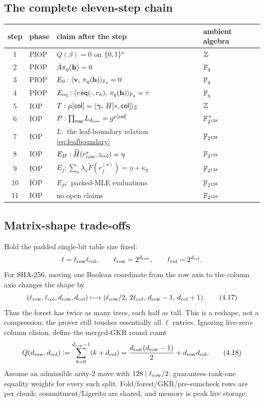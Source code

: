 \subsection{The complete eleven-step chain}

\begin{center}\small
\begin{tabular}{@{}clp{}l@{}}
\toprule
step & phase & claim after the step & ambient algebra\\
\midrule
1 & PIOP & $Q(\beta)=0$ on $\{0,1\}^{\nu}$ & $\mathbb{Z}$\\
2 & PIOP & $\bar A\pi_q(\mathbf{h})=0$ & $\mathbb{F}_q$\\
3 & PIOP & $E_0:\langle \mathbf{v},\, \pi_q(\mathbf{h})\rangle_{\mathbb{F}_q}=0$ & $\mathbb{F}_q$\\
4 & PIOP & $E_{\rm eq}:\langle c\,\mathsf{eq}(\cdot,r_h),\, \pi_q(\mathbf{h})\rangle_{\mathbb{F}_q}=\tau$ & $\mathbb{F}_q$\\
5 & IOP & $T:\mu[\mathsf{col}]=\langle \bm{\gamma},\, H[*,\mathsf{col}]\rangle_{\mathbb{Z}}$ & $\mathbb{Z}$\\
6 & IOP & $P:\prod_{\mathsf{row}}L_{d_{\mathrm{row}}}=g^{\mu[\mathsf{col}]}$ & $\mathbb{F}_{2^{128}}^\times$\\
7 & IOP & $L:$ the leaf-boundary relation \eqref{eq:leafboundary} & $\mathbb{F}_{2^{128}}$\\
8 & IOP & $E_H:\widetilde H(r_{\rm row}^{*},z_{\mathrm{col}})=\eta$ & $\mathbb{F}_{2^{128}}$\\
9 & IOP & $E_f:\sum_a\lambda_a\widetilde F(r_f^{(a)})=\eta+\kappa_0$ & $\mathbb{F}_{2^{128}}$\\
10 & IOP & $E_P:$ packed-MLE evaluations & $\mathbb{F}_{2^{128}}$\\
11 & IOP & no open claims & $\mathbb{F}_{2^{128}}$\\
\bottomrule
\end{tabular}
\end{center}

\subsection{Matrix-shape trade-offs}
\label{sec:matrix-shape-tradeoffs}

Hold the padded single-bit table size fixed:
\[
  \ell=\ell_{\mathrm{row}}\ell_{\mathrm{col}},
  \qquad
  \ell_{\mathrm{row}}=2^{d_{\mathrm{row}}},
  \qquad
  \ell_{\mathrm{col}}=2^{d_{\mathrm{col}}}.
\]
For SHA-256, moving one Boolean coordinate from the row axis to the column axis
changes the shape by
\[
  (\ell_{\mathrm{row}},\ell_{\mathrm{col}},d_{\mathrm{row}},d_{\mathrm{col}})
  \longmapsto
  (\ell_{\mathrm{row}}/2,\,2\ell_{\mathrm{col}},\,d_{\mathrm{row}}-1,\,d_{\mathrm{col}}+1).       \tag{4.17}
\]
Thus the forest has twice as many trees, each half as tall.  This is a reshape,
not a compression: the prover still touches essentially all $\ell$ entries.
Ignoring live-zero-column elision, define the merged-GKR round count
\[
  Q(d_{\mathrm{row}},d_{\mathrm{col}})
  \vcentcolon=
  \sum_{k=0}^{d_{\mathrm{row}}-1}(k+d_{\mathrm{col}})
  =\frac{d_{\mathrm{row}}(d_{\mathrm{row}}-1)}2+d_{\mathrm{row}}d_{\mathrm{col}}.                \tag{4.18}
\]
Assume an admissible arity-$2$ move with $128\mid\ell_{\mathrm{row}}/2$.
 guarantees rank-one equality weights for every such split.
Fold/forest/GKR/pre-sumcheck rows are per chunk;
commitment/Ligerito are shared, and memory is peak live storage.

